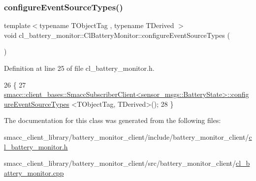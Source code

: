 \subsubsection{\texorpdfstring{configure\+Event\+Source\+Types()}{configureEventSourceTypes()}}
{\footnotesize\ttfamily template$<$typename T\+Object\+Tag , typename T\+Derived $>$ \\
void cl\+\_\+battery\+\_\+monitor\+::\+Cl\+Battery\+Monitor\+::configure\+Event\+Source\+Types (\begin{DoxyParamCaption}{ }\end{DoxyParamCaption})\hspace{0.3cm}{\ttfamily [inline]}}



Definition at line 25 of file cl\+\_\+battery\+\_\+monitor.\+h.


\begin{DoxyCode}
26     \{
27         
      \hyperlink{classsmacc_1_1client__bases_1_1SmaccSubscriberClient}{smacc::client\_bases::SmaccSubscriberClient<sensor\_msgs::BatteryState>::configureEventSourceTypes}
      <TObjectTag, TDerived>();
28     \}
\end{DoxyCode}


The documentation for this class was generated from the following files\+:\begin{DoxyCompactItemize}
\item 
smacc\+\_\+client\+\_\+library/battery\+\_\+monitor\+\_\+client/include/battery\+\_\+monitor\+\_\+client/\hyperlink{cl__battery__monitor_8h}{cl\+\_\+battery\+\_\+monitor.\+h}\item 
smacc\+\_\+client\+\_\+library/battery\+\_\+monitor\+\_\+client/src/battery\+\_\+monitor\+\_\+client/\hyperlink{cl__battery__monitor_8cpp}{cl\+\_\+battery\+\_\+monitor.\+cpp}\end{DoxyCompactItemize}
